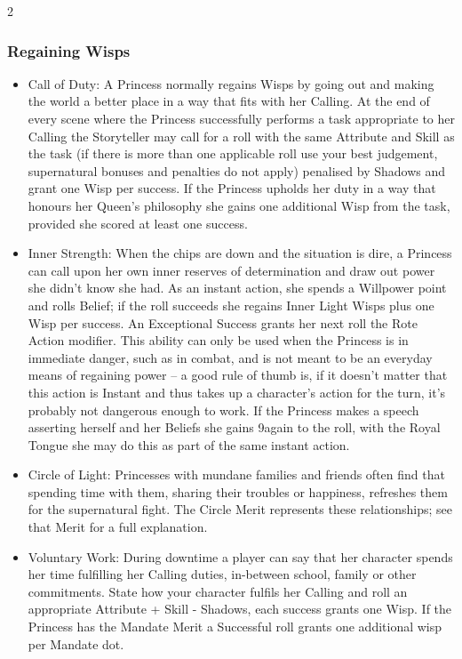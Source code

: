 \begin{multicols}{2}
\subsubsection*{Regaining Wisps}
\begin{itemize}
\item    Call of Duty: A Princess normally regains Wisps by going out and making the world a better place in a way that fits with her Calling. At the end of every scene where the Princess successfully performs a task appropriate to her Calling the Storyteller may call for a roll with the same Attribute and Skill as the task (if there is more than one applicable roll use your best judgement, supernatural bonuses and penalties do not apply) penalised by Shadows and grant one Wisp per success. If the Princess upholds her duty in a way that honours her Queen’s philosophy she gains one additional Wisp from the task, provided she scored at least one success.
\item    Inner Strength: When the chips are down and the situation is dire, a Princess can call upon her own inner reserves of determination and draw out power she didn't know she had. As an instant action, she spends a Willpower point and rolls Belief; if the roll succeeds she regains Inner Light Wisps plus one Wisp per success. An Exceptional Success grants her next roll the Rote Action modifier. This ability can only be used when the Princess is in immediate danger, such as in combat, and is not meant to be an everyday means of regaining power -- a good rule of thumb is, if it doesn't matter that this action is Instant and thus takes up a character's action for the turn, it's probably not dangerous enough to work. If the Princess makes a speech asserting herself and her Beliefs she gains 9again to the roll, with the Royal Tongue she may do this as part of the same instant action. 
\item    Circle of Light: Princesses with mundane families and friends often find that spending time with them, sharing their troubles or happiness, refreshes them for the supernatural fight. The Circle Merit represents these relationships; see that Merit for a full explanation. 
\item Voluntary Work: During downtime a player can say that her character spends her time fulfilling her Calling duties, in-between school, family or other commitments. State how your character fulfils her Calling and roll an appropriate Attribute + Skill - Shadows, each success grants one Wisp. If the Princess has the Mandate Merit a Successful roll grants one additional wisp per Mandate dot.
\end{itemize}


\end{multicols}
